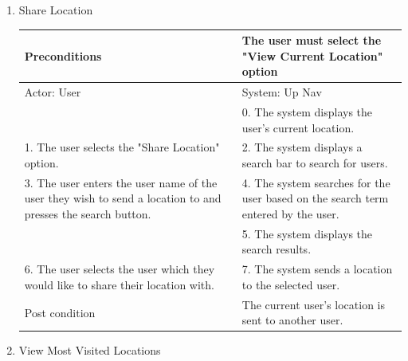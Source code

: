 \documentclass{article}
\begin{document}
\begin{enumerate}
\begin{center}
\begin{enumerate}
\begin{enumerate}
	\item{Share Location}

	\begin{table}[H]
	\centering
		\begin{tabular}{ | p{15em} | p{15em}| }
		\hline
		Preconditions                                                                                                						& The user must select the "View Current Location" option \\ 
		\hline
		Actor: User                                                                                                						 	& System: Up Nav \\ 
		\hline
                                                                                                            									& 0. The system displays the user's current location. \\ 
		\hline
		1. The user selects the "Share Location" option.                                                            					& 2. The system displays a search bar to search for users. \\
		\hline
		3. The user enters the user name of the user they wish to send a location to and presses the search button. 	& 4. The system searches for the user based on the search term entered by the user. \\ 
		\hline
                                                                                                            									& 5. The system displays the search results. \\ 
		\hline
		6. The user selects the user which they would like to share their location with.                            			& 7. The system sends a location to the selected user. \\ 
		\hline
		Post condition                                                                                               						& The current user's location is sent to another user. \\ 
		\hline
		\end{tabular}
	\end{table}

	\item{View Most Visited Locations}


\end{enumerate}
\end{enumerate}
\end{center}
\end{enumerate}
\end{document}
